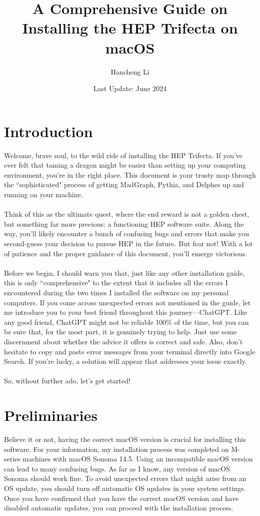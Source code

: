 \documentclass[12pt, english]{article}
\title{A Comprehensive Guide on Installing the HEP Trifecta on macOS}
\author{Hancheng Li}
\date{Last Update: June 2024}
\begin{document}
\maketitle

\section{Introduction}
Welcome, brave soul, to the wild ride of installing the HEP Trifecta. If you've ever felt that taming a dragon might be easier than setting up your computing environment, you're in the right place. This document is your trusty map through the ``sophisticated" process of getting MadGraph, Pythia, and Delphes up and running on your machine. \\\\
Think of this as the ultimate quest, where the end reward is not a golden chest, but something far more precious: a functioning HEP software suite. Along the way, you’ll likely encounter a bunch of confusing bugs and errors that make you second-guess your decision to pursue HEP in the future. But fear not! With a lot of patience and the proper guidance of this document, you’ll emerge victorious.\\\\
Before we begin, I should warn you that, just like any other installation guide, this is only ``comprehensive" to the extent that it includes all the errors I encountered during the two times I installed the software on my personal computers. If you come across unexpected errors not mentioned in the guide, let me introduce you to your best friend throughout this journey—ChatGPT. Like any good friend, ChatGPT might not be reliable 100\% of the time, but you can be sure that, for the most part, it is genuinely trying to help. Just use some discernment about whether the advice it offers is correct and safe. Also, don't hesitate to copy and paste error messages from your terminal directly into Google Search. If you're lucky, a solution will appear that addresses your issue exactly. \\\\
So, without further ado, let’s get started!

\section{Preliminaries}
Believe it or not, having the correct macOS version is crucial for installing this software. For your information, my installation process was completed on M-series machines with macOS Sonoma 14.5. Using an incompatible macOS version can lead to many confusing bugs. As far as I know, any version of macOS Sonoma should work fine. To avoid unexpected errors that might arise from an OS update, you should turn off automatic OS updates in your system settings. Once you have confirmed that you have the correct macOS version and have disabled automatic updates, you can proceed with the installation process.
\end{document}
